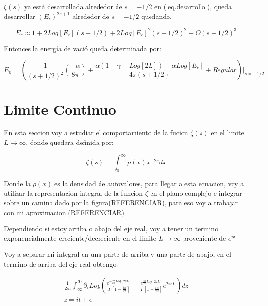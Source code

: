 $\zeta (s)$ ya está desarrollada alrededor de $s=-1/2$ en (\ref{eq.desarrollo}), queda desarrollar $(E_c) ^{2s+1} $ alrededor de $s=-1/2$ quedando.

\begin{equation}
    E _c \approx 
    1 + 2 Log[E_c] (s + 1/2) +
    2 Log[E_c] ^2 (s+1/2) ^2 + 
    O (s+1/2)^3
\end{equation}

Entonces la energía de vació queda determinada por:

\begin{equation}
    E _0 =
    \left(
    \frac{1}{(s+1/2)^2} 
    \left(
    \frac{- \alpha}{8 \pi}
    \right)+
    \frac{
    \alpha(1 -\gamma-Log[2L]) - 
    \alpha Log[E_c] 
    }{4 \pi (s+1/2)} 
     + Regular
    \right) | _{s=-1/2}
\end{equation}


\chapter{Limite Continuo}

En esta seccion voy a estudiar el comportamiento de la fucion $\zeta (s) $ en el limite $L \rightarrow \infty$, donde quedara definida por:

\begin{equation}
\zeta (s) = \int _{0} ^{\infty} \rho (x) x^{-2 s} dx
\end{equation}

Donde la $\rho(x) $ es la densidad de autovalores, para llegar a esta ecuacion, voy a utilizar la representacion integral de la funcion $\zeta$ en el plano complejo e integrar sobre un camino dado por la figura(REFERENCIAR), para eso voy a trabajar con mi aproximacion (REFERENCIAR)



Dependiendo si estoy arriba o abajo del eje real, voy a tener un termino exponencialmente creciente/decreciente en el limite $L \rightarrow \infty$ proveniente de $e ^{i q}$

Voy a separar mi integral en una parte de arriba y una parte de abajo, en el termino de arriba del eje real obtengo:

\begin{equation}
\begin{array}{c}
\frac{1}{2 \pi i} \int _{\infty} ^{t0} 
\partial _t
Log
\left(
\frac{e ^{- \frac{i \alpha}{2 \lambda} Log[2 z  L]} }{\Gamma[1-\frac{i \alpha}{2 z }]} -
\frac{e ^{ \frac{i \alpha}{2 z } Log[2 z  L]} }{\Gamma[1-\frac{i \alpha}{2 z }]}
e ^{2 i z  L }
\right) d z \\
z = i t + \epsilon 
\end{array}
\end{equation}

